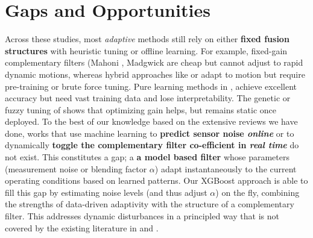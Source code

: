 \documentclass{iutbscthesis}
\begin{document}
\section{Gaps and Opportunities}
Across these studies, most \textit{adaptive} methods still rely on either \textbf{fixed fusion structures} with heuristic tuning or offline learning. For example, fixed-gain complementary filters (Mahoni \cite{mahony2008nonlinear}, Madgwick \cite{madgwick2011estimation} are cheap but cannot adjust to rapid dynamic motions, whereas hybrid approaches like \cite{vertzberger2022adaptive} or \cite{wang2020mems} adapt to motion but require pre-training or brute force tuning. Pure learning methods in \cite{denoising}, \cite{golroudbari2023cnn6DOF} achieve excellent accuracy but need vast training data and lose interpretability. The genetic or fuzzy tuning of \cite{maton2024indirectgainGA} shows that optimizing gain helps, but remains static once deployed. To the best of our knowledge based on the extensive reviews we have done, works that use machine learning to \textbf{predict sensor noise \textit{online}} or to dynamically \textbf{toggle the complementary filter co-efficient in \textit{real time}} do not exist. This constitutes a gap; a \textbf{a model based filter} whose parameters (measurement noise or blending factor $\alpha$) adapt instantaneously to the current operating conditions based on learned patterns. Our XGBoost approach is able to fill this gap by estimating noise levels (and thus adjust $\alpha$) on the fly, combining the strengths of data-driven adaptivity with the structure of a complementary filter. This addresses dynamic disturbances in a principled way that is not covered by the existing literature in \cite{vertzberger2022adaptive} and \cite{denoising}. 
\end{document}
